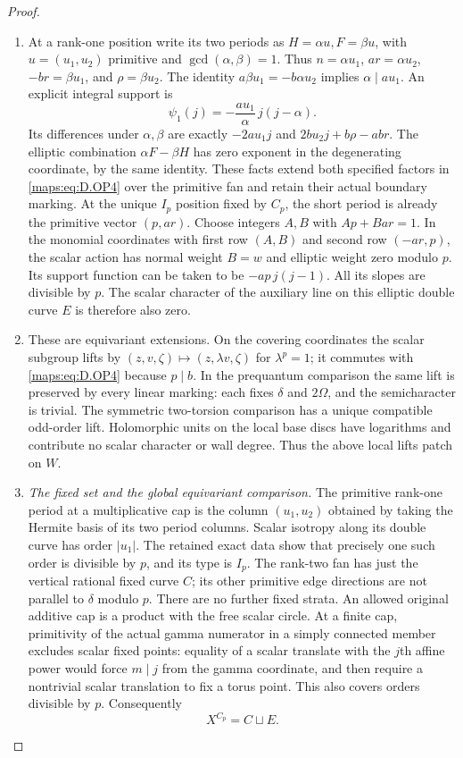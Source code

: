 \begin{proof}
\begin{enumerate}[label=\arabic*.,leftmargin=*]
\item At a rank-one position write its two periods as
$H=\alpha u,F=\beta u$, with $u=(u_1,u_2)$ primitive and
$\gcd(\alpha,\beta)=1$. Thus $n=\alpha u_1$,
$ar=\alpha u_2$, $-br=\beta u_1$, and $\rho=\beta u_2$.
The identity $a\beta u_1=-b\alpha u_2$ implies
$\alpha\mid au_1$. An explicit integral support is
\[
           \psi_1(j)=-\frac{au_1}{\alpha}\,j(j-\alpha).
 \tag{D.OP5a}\label{maps:eq:D.OP5a}
\]
Its differences under $\alpha,\beta$ are exactly
$-2au_1j$ and $2bu_2j+b\rho-ab r$.
The elliptic combination $\alpha F-\beta H$ has zero
exponent in the degenerating coordinate, by the same identity.
These facts extend both specified factors in \eqref{maps:eq:D.OP4} over the
primitive fan and retain their actual boundary marking.
At the unique $I_p$ position fixed by $C_p$, the short period
is already the primitive vector $(p,ar)$. Choose
integers $A,B$ with $Ap+B ar=1$. In the monomial coordinates
with first row $(A,B)$ and second row $(-ar,p)$, the scalar
action has normal weight $B=w$ and elliptic weight zero
modulo $p$. Its support function can be taken to be
$-ap\,j(j-1)$. All its slopes are divisible by $p$.
The scalar character of the auxiliary line on this elliptic
double curve $E$ is therefore also zero.

\item These are equivariant extensions. On the covering coordinates
the scalar subgroup lifts by $(z,v,\zeta)\mapsto
(z,\lambda v,\zeta)$ for $\lambda^p=1$; it commutes with
\eqref{maps:eq:D.OP4} because $p\mid b$. In the prequantum comparison the
same lift is preserved by every linear marking: each fixes
$\delta$ and $2\Omega$, and the semicharacter is trivial.
The symmetric two-torsion comparison has a unique compatible
odd-order lift. Holomorphic units on the local base discs
have logarithms and contribute no scalar character or wall
degree. Thus the above local lifts patch on $W$.

\item \emph{The fixed set and the global equivariant comparison.}
The primitive rank-one period at a multiplicative cap is the
column $(u_1,u_2)$ obtained by taking the Hermite basis of its
two period columns. Scalar isotropy along its double curve
has order $|u_1|$. The retained exact data show that precisely
one such order is divisible by $p$, and its type is $I_p$.
The rank-two fan has just the vertical rational fixed curve
$C$; its other primitive edge directions are not parallel to
$\delta$ modulo $p$. There are no further fixed strata.
An allowed original additive cap is a product with the free
scalar circle. At a finite cap, primitivity of the actual gamma
numerator in a simply connected member excludes scalar fixed
points: equality of a scalar translate with the $j$th affine
power would force $m\mid j$ from the gamma coordinate, and
then require a nontrivial scalar translation to fix a torus
point. This also covers orders divisible by $p$.
Consequently
\[
                         X^{C_p}=C\sqcup E.
 \tag{D.OP7}\label{maps:eq:D.OP7}
\]


\end{enumerate}
\end{proof}
